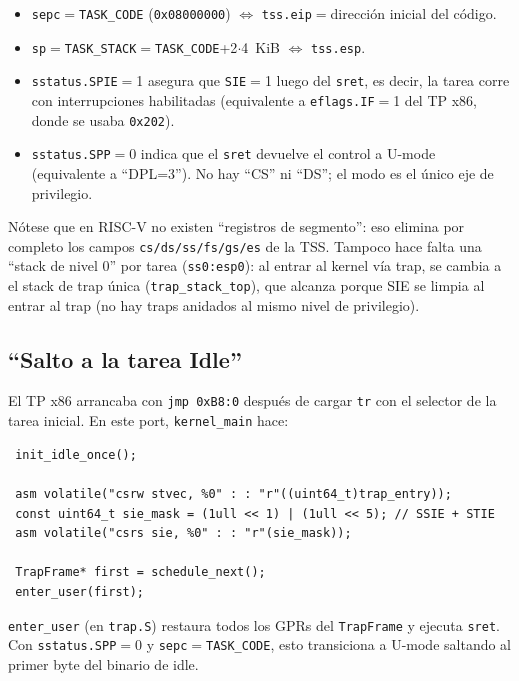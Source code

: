 \begin{itemize}
  \item \texttt{sepc}$=$\texttt{TASK\_CODE} (\texttt{0x08000000}) $\Leftrightarrow$ \texttt{tss.eip}$=$dirección inicial
  del código.
  \item \texttt{sp}$=$\texttt{TASK\_STACK}$=$\texttt{TASK\_CODE}+2$\cdot$4~KiB $\Leftrightarrow$ \texttt{tss.esp}.
  \item \texttt{sstatus.SPIE}$=$1 asegura que \texttt{SIE}$=$1 luego del \texttt{sret}, es decir, la tarea corre con
  interrupciones habilitadas (equivalente a \texttt{eflags.IF}$=$1 del TP x86, donde se usaba \texttt{0x202}).
  \item \texttt{sstatus.SPP}$=$0 indica que el \texttt{sret} devuelve el control a U-mode (equivalente a ``DPL=3''). No
  hay ``CS'' ni ``DS''; el modo es el único eje de privilegio.
\end{itemize}

Nótese que en RISC-V no existen ``registros de segmento'': eso elimina por completo los campos
\texttt{cs/ds/ss/fs/gs/es} de la TSS. Tampoco hace falta una ``stack de nivel 0'' por tarea (\texttt{ss0:esp0}): al
entrar al kernel vía trap, se cambia a el stack de trap única (\texttt{trap\_stack\_top}), que alcanza porque SIE se
limpia al entrar al trap (no hay traps anidados al mismo nivel de privilegio).

\subsection{``Salto a la tarea Idle''}

El TP x86 arrancaba con \texttt{jmp 0xB8:0} después de cargar \texttt{tr} con el selector de la tarea inicial. En este
port, \texttt{kernel\_main} hace:

\begin{codesnippet}
\begin{verbatim}
 init_idle_once();

 asm volatile("csrw stvec, %0" : : "r"((uint64_t)trap_entry));
 const uint64_t sie_mask = (1ull << 1) | (1ull << 5); // SSIE + STIE
 asm volatile("csrs sie, %0" : : "r"(sie_mask));

 TrapFrame* first = schedule_next();
 enter_user(first);
\end{verbatim}
\end{codesnippet}

\texttt{enter\_user} (en \texttt{trap.S}) restaura todos los GPRs del \texttt{TrapFrame} y ejecuta \texttt{sret}. Con
\texttt{sstatus.SPP}$=$0 y \texttt{sepc}$=$\texttt{TASK\_CODE}, esto transiciona a U-mode saltando al primer byte del
binario de idle.

